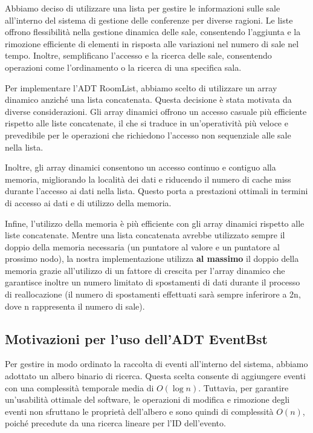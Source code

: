 \documentclass[11pt]{scrartcl} %
\begin{document}
Abbiamo deciso di utilizzare una lista per gestire le informazioni sulle sale all'interno del sistema di gestione delle conferenze per diverse ragioni. Le liste offrono flessibilità nella gestione dinamica delle sale, consentendo l'aggiunta e la rimozione efficiente di elementi in risposta alle variazioni nel numero di sale nel tempo. Inoltre, semplificano l'accesso e la ricerca delle sale, consentendo operazioni come l'ordinamento o la ricerca di una specifica sala.

Per implementare l'ADT RoomList, abbiamo scelto di utilizzare un array dinamico anziché una lista concatenata. Questa decisione è stata motivata da diverse considerazioni. Gli array dinamici offrono un accesso casuale più efficiente rispetto alle liste concatenate, il che si traduce in un'operatività più veloce e prevedibile per le operazioni che richiedono l'accesso non sequenziale alle sale nella lista.

Inoltre, gli array dinamici consentono un accesso continuo e contiguo alla memoria, migliorando la località dei dati e riducendo il numero di cache miss durante l'accesso ai dati nella lista. Questo porta a prestazioni ottimali in termini di accesso ai dati e di utilizzo della memoria.

Infine, l'utilizzo della memoria è più efficiente con gli array dinamici rispetto alle liste concatenate. Mentre una lista concatenata avrebbe utilizzato sempre il doppio della memoria necessaria (un puntatore al valore e un puntatore al prossimo nodo), la nostra implementazione utilizza \textbf{al massimo} il doppio della memoria grazie all'utilizzo di un fattore di crescita per l'array dinamico che garantisce inoltre un numero limitato di spostamenti di dati durante il processo di reallocazione (il numero di spostamenti effettuati sarà sempre inferirore a 2n, dove n rappresenta il numero di sale).


\subsection{Motivazioni per l'uso dell'ADT EventBst}
Per gestire in modo ordinato la raccolta di eventi all'interno del sistema, abbiamo adottato un albero binario di ricerca. Questa scelta consente di aggiungere eventi con una complessità temporale media di \( O(\log{n}) \). Tuttavia, per garantire un'usabilità ottimale del software, le operazioni di modifica e rimozione degli eventi non sfruttano le proprietà dell'albero e sono quindi di complessità \( O(n) \), poiché precedute da una ricerca lineare per l'ID dell'evento.
\end{document}
